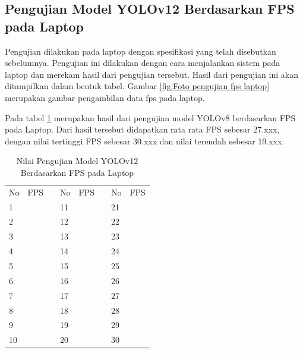 \subsection{Pengujian Model YOLOv12 Berdasarkan FPS pada Laptop}

Pengujian dilakukan pada laptop dengan spesifikasi yang telah disebutkan sebelumnya. Pengujian ini dilakukan dengan cara menjalankan sistem pada laptop dan merekam hasil dari pengujian tersebut. Hasil dari pengujian ini akan ditampilkan dalam bentuk tabel. Gambar \ref{fig:Foto pengujian fps laptop} merupakan gambar pengambilan data fps pada laptop.

Pada tabel \ref{tb:TabelYolov12xLaptop} merupakan hasil dari pengujian model YOLOv8 berdasarkan FPS pada Laptop. Dari hasil tersebut didapatkan rata rata FPS sebesar 27.xxx, dengan nilai tertinggi FPS sebesar 30.xxx dan nilai terendah sebesar 19.xxx.

\begin{table}[H]
  \centering
  \caption{Nilai Pengujian Model YOLOv12 Berdasarkan FPS pada Laptop} 
  \label{tb:TabelYolov12xLaptop}
  \begin{tabular}{|l|l|l|l|l|l|l|l|}
  \cline{1-2} \cline{4-5} \cline{7-8}
  No & FPS &  & No & FPS &  & No & FPS \\ \cline{1-2} \cline{4-5} \cline{7-8} 
  1  &     &  & 11 &     &  & 21 &     \\ \cline{1-2} \cline{4-5} \cline{7-8} 
  2  &     &  & 12 &     &  & 22 &     \\ \cline{1-2} \cline{4-5} \cline{7-8} 
  3  &     &  & 13 &     &  & 23 &     \\ \cline{1-2} \cline{4-5} \cline{7-8} 
  4  &     &  & 14 &     &  & 24 &     \\ \cline{1-2} \cline{4-5} \cline{7-8} 
  5  &     &  & 15 &     &  & 25 &     \\ \cline{1-2} \cline{4-5} \cline{7-8} 
  6  &     &  & 16 &     &  & 26 &     \\ \cline{1-2} \cline{4-5} \cline{7-8} 
  7  &     &  & 17 &     &  & 27 &     \\ \cline{1-2} \cline{4-5} \cline{7-8} 
  8  &     &  & 18 &     &  & 28 &     \\ \cline{1-2} \cline{4-5} \cline{7-8} 
  9  &     &  & 19 &     &  & 29 &     \\ \cline{1-2} \cline{4-5} \cline{7-8} 
  10 &     &  & 20 &     &  & 30 &     \\ \cline{1-2} \cline{4-5} \cline{7-8} 
  \end{tabular}
  \end{table}


